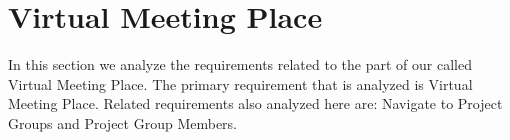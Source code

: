 \section{Virtual Meeting Place}
\label{sec:virtualMeetingPlace}
\label{sec:projectgroup}

In this section we analyze the requirements related to the part of our \subsystem{} called Virtual Meeting Place.
The primary requirement that is analyzed is Virtual Meeting Place.
Related requirements also analyzed here are: Navigate to Project Groups and Project Group Members.

